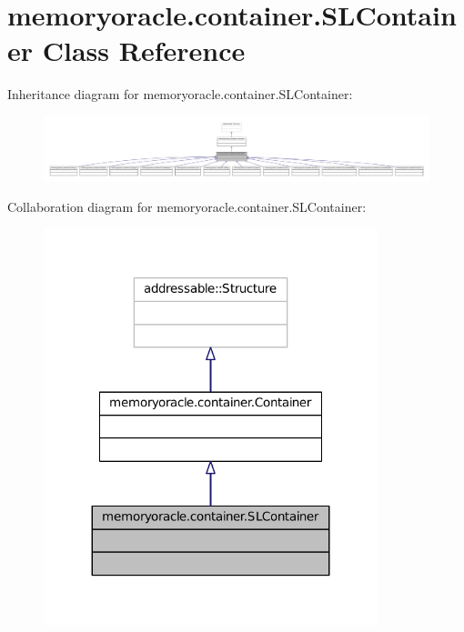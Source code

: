 \hypertarget{classmemoryoracle_1_1container_1_1SLContainer}{}\section{memoryoracle.\+container.\+S\+L\+Container Class Reference}
\label{classmemoryoracle_1_1container_1_1SLContainer}


Inheritance diagram for memoryoracle.\+container.\+S\+L\+Container\+:\nopagebreak
\begin{figure}[H]
\begin{center}
\leavevmode
\includegraphics[width=350pt]{classmemoryoracle_1_1container_1_1SLContainer__inherit__graph}
\end{center}
\end{figure}


Collaboration diagram for memoryoracle.\+container.\+S\+L\+Container\+:\nopagebreak
\begin{figure}[H]
\begin{center}
\leavevmode
\includegraphics[width=275pt]{classmemoryoracle_1_1container_1_1SLContainer__coll__graph}
\end{center}
\end{figure}


